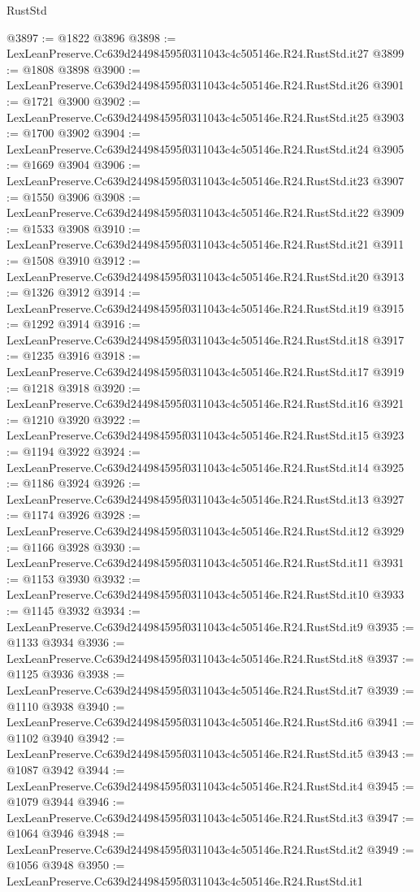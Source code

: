 \begin{lexlean}{RustStd}
\begin{coremodule}
@3897 := @1822 @3896
@3898 := LexLeanPreserve.Cc639d244984595f0311043c4c505146e.R24.RustStd.it27
@3899 := @1808 @3898
@3900 := LexLeanPreserve.Cc639d244984595f0311043c4c505146e.R24.RustStd.it26
@3901 := @1721 @3900
@3902 := LexLeanPreserve.Cc639d244984595f0311043c4c505146e.R24.RustStd.it25
@3903 := @1700 @3902
@3904 := LexLeanPreserve.Cc639d244984595f0311043c4c505146e.R24.RustStd.it24
@3905 := @1669 @3904
@3906 := LexLeanPreserve.Cc639d244984595f0311043c4c505146e.R24.RustStd.it23
@3907 := @1550 @3906
@3908 := LexLeanPreserve.Cc639d244984595f0311043c4c505146e.R24.RustStd.it22
@3909 := @1533 @3908
@3910 := LexLeanPreserve.Cc639d244984595f0311043c4c505146e.R24.RustStd.it21
@3911 := @1508 @3910
@3912 := LexLeanPreserve.Cc639d244984595f0311043c4c505146e.R24.RustStd.it20
@3913 := @1326 @3912
@3914 := LexLeanPreserve.Cc639d244984595f0311043c4c505146e.R24.RustStd.it19
@3915 := @1292 @3914
@3916 := LexLeanPreserve.Cc639d244984595f0311043c4c505146e.R24.RustStd.it18
@3917 := @1235 @3916
@3918 := LexLeanPreserve.Cc639d244984595f0311043c4c505146e.R24.RustStd.it17
@3919 := @1218 @3918
@3920 := LexLeanPreserve.Cc639d244984595f0311043c4c505146e.R24.RustStd.it16
@3921 := @1210 @3920
@3922 := LexLeanPreserve.Cc639d244984595f0311043c4c505146e.R24.RustStd.it15
@3923 := @1194 @3922
@3924 := LexLeanPreserve.Cc639d244984595f0311043c4c505146e.R24.RustStd.it14
@3925 := @1186 @3924
@3926 := LexLeanPreserve.Cc639d244984595f0311043c4c505146e.R24.RustStd.it13
@3927 := @1174 @3926
@3928 := LexLeanPreserve.Cc639d244984595f0311043c4c505146e.R24.RustStd.it12
@3929 := @1166 @3928
@3930 := LexLeanPreserve.Cc639d244984595f0311043c4c505146e.R24.RustStd.it11
@3931 := @1153 @3930
@3932 := LexLeanPreserve.Cc639d244984595f0311043c4c505146e.R24.RustStd.it10
@3933 := @1145 @3932
@3934 := LexLeanPreserve.Cc639d244984595f0311043c4c505146e.R24.RustStd.it9
@3935 := @1133 @3934
@3936 := LexLeanPreserve.Cc639d244984595f0311043c4c505146e.R24.RustStd.it8
@3937 := @1125 @3936
@3938 := LexLeanPreserve.Cc639d244984595f0311043c4c505146e.R24.RustStd.it7
@3939 := @1110 @3938
@3940 := LexLeanPreserve.Cc639d244984595f0311043c4c505146e.R24.RustStd.it6
@3941 := @1102 @3940
@3942 := LexLeanPreserve.Cc639d244984595f0311043c4c505146e.R24.RustStd.it5
@3943 := @1087 @3942
@3944 := LexLeanPreserve.Cc639d244984595f0311043c4c505146e.R24.RustStd.it4
@3945 := @1079 @3944
@3946 := LexLeanPreserve.Cc639d244984595f0311043c4c505146e.R24.RustStd.it3
@3947 := @1064 @3946
@3948 := LexLeanPreserve.Cc639d244984595f0311043c4c505146e.R24.RustStd.it2
@3949 := @1056 @3948
@3950 := LexLeanPreserve.Cc639d244984595f0311043c4c505146e.R24.RustStd.it1

\end{coremodule}
\end{lexlean}
